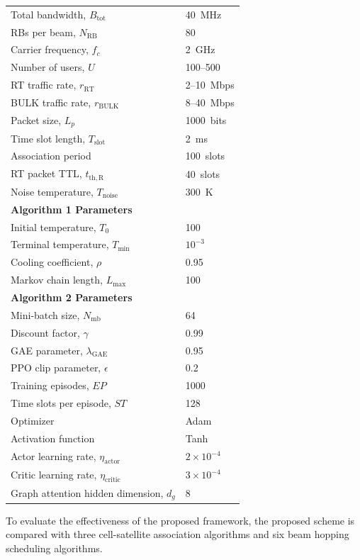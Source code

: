 \documentclass[journal]{IEEEtran}
\begin{document}
\begin{table}[t]
\begin{tabular}{l|l}
Total bandwidth, $B_{\mathrm{tot}}$ & 40~MHz \\
RBs per beam, $N_{\mathrm{RB}}$ & 80 \\
Carrier frequency, $f_c$ & 2~GHz \\
Number of users, $U$ & 100--500 \\
RT traffic rate, $r_{\mathrm{RT}}$ & 2--10~Mbps \\
BULK traffic rate, $r_{\mathrm{BULK}}$ & 8--40~Mbps \\
Packet size, $L_p$ & 1000~bits \\
Time slot length, $T_{\mathrm{slot}}$ & 2~ms \\
Association period & 100~slots \\
RT packet TTL, $t_{\mathrm{th},\mathrm{R}}$ & 40~slots \\
Noise temperature, $T_{\mathrm{noise}}$ & 300~K \\
\hline
\multicolumn{2}{l}{\textbf{Algorithm 1 Parameters}} \\
Initial temperature, $T_0$ & 100 \\
Terminal temperature, $T_{\min}$ & $10^{-3}$ \\
Cooling coefficient, $\rho$ & 0.95 \\
Markov chain length, $L_{\max}$ & 100 \\
\hline
\multicolumn{2}{l}{\textbf{Algorithm 2 Parameters}} \\
Mini-batch size, $N_{\mathrm{mb}}$ & 64 \\
Discount factor, $\gamma$ & 0.99 \\
GAE parameter, $\lambda_{\mathrm{GAE}}$ & 0.95 \\
PPO clip parameter, $\epsilon$ & 0.2 \\
Training episodes, $EP$ & 1000 \\
Time slots per episode, $ST$ & 128 \\
Optimizer & Adam \\
Activation function & Tanh \\
Actor learning rate, $\eta_{\mathrm{actor}}$ & $2\times10^{-4}$ \\
Critic learning rate, $\eta_{\mathrm{critic}}$ & $3\times10^{-4}$ \\
Graph attention hidden dimension, $d_g$ & 8 \\
\hline
\end{tabular}
\end{table}

To evaluate the effectiveness of the proposed framework, the proposed scheme is compared with three cell-satellite association algorithms and six beam hopping scheduling algorithms. 
\end{document}
